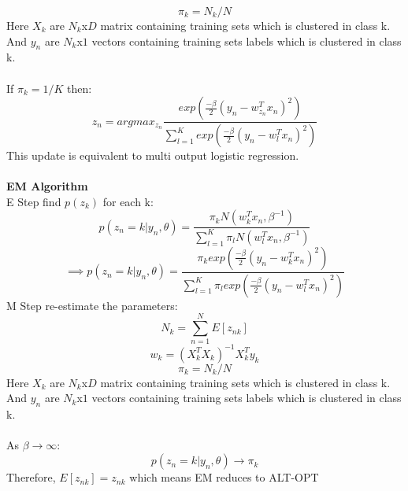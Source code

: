 \documentclass[a4paper,11pt]{article}
\begin{document}
\begin{mlsolution}
\begin{equation}
  \pi_{k} = N_{k}/N
\end{equation}
Here $X_{k}$ are $N_{k}$x$D$ matrix containing training sets which is clustered in class k. And $y_{n}$ are $N_{k}$x$1$ vectors containing training sets labels which is clustered in class k. \\ \\
If $\pi_{k} = 1/K$ then:
\begin{equation}
 z_{n} = argmax_{z_{n}}\frac{exp(\frac{-\beta}{2}(y_{n}-w_{z_{n}}^{T}x_{n})^{2})}{\sum_{l=1}^{K}exp(\frac{-\beta}{2}(y_{n}-w_{l}^{T}x_{n})^{2})}
\end{equation}
This update is equivalent to multi output logistic regression. \\ \\
\noindent
\textbf{EM Algorithm}\\
E Step find $p(z_{k})$ for each k: \\
\begin{equation}
  p(z_{n}=k|y_{n},\theta) = \frac{\pi_{k}N(w_{k}^{T}x_{n}, \beta^{-1})}{\sum_{l=1}^{K}\pi_{l}N(w_{l}^{T}x_{n}, \beta^{-1})}
\end{equation}
\begin{equation}
  \implies p(z_{n}=k|y_{n},\theta) = \frac{\pi_{k}exp(\frac{-\beta}{2}(y_{n}-w_{k}^{T}x_{n})^{2})}{\sum_{l=1}^{K}\pi_{l}exp(\frac{-\beta}{2}(y_{n}-w_{l}^{T}x_{n})^{2})}
\end{equation}
M Step re-estimate the parameters: \\
\begin{equation}
  N_{k} = \sum_{n=1}^{N}E[z_{nk}]
\end{equation}
\begin{equation}
  w_{k} = (X_{k}^{T}X_{k})^{-1}X_{k}^{T}y_{k}
\end{equation}
\begin{equation}
  \pi_{k} = N_{k}/N
\end{equation}
Here $X_{k}$ are $N_{k}$x$D$ matrix containing training sets which is clustered in class k. And $y_{n}$ are $N_{k}$x$1$ vectors containing training sets labels which is clustered in class k. \\ \\
As $\beta \rightarrow \infty$:
\begin{equation}
  p(z_{n}=k|y_{n},\theta) \rightarrow \pi_{k}
\end{equation}
Therefore, $E[z_{nk}] = z_{nk}$ which means EM reduces to ALT-OPT


\end{mlsolution}
\end{document}
